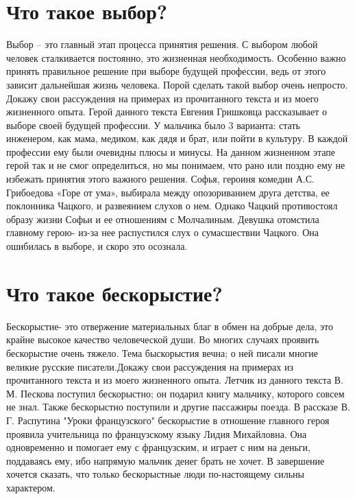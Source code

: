 \documentclass[12pt, letterpaper]{article}
\begin{document}
\section{Что такое выбор?}
Выбор – это главный этап процесса принятия решения. С выбором любой человек сталкивается постоянно, это жизненная необходимость. Особенно важно принять правильное решение при выборе будущей профессии, ведь от этого зависит дальнейшая жизнь человека. Порой сделать такой выбор очень непросто. Докажу свои рассуждения на примерах из прочитанного текста и из моего жизненного опыта.
Герой данного текста Евгения Гришковца рассказывает о выборе своей будущей профессии. У мальчика было 3 варианта: стать инженером, как мама, медиком, как дядя и брат, или пойти в культуру. В каждой профессии ему были очевидны плюсы и минусы. На данном жизненном этапе герой так и не смог определиться, но мы понимаем, что рано или поздно ему не избежать принятия этого важного решения. 
Софья, героиня комедии А.С. Грибоедова «Горе от ума», выбирала между опозориванием друга детства, ее поклонника Чацкого, и развеянием слухов о нем. Однако Чацкий противостоял образу жизни Софьи и ее отношениям с Молчалиным. Девушка отомстила главному герою- из-за нее распустился слух о сумасшествии Чацкого. Она ошибилась в выборе, и скоро это осознала.

\section{Что такое бескорыстие?}
Бескорыстие- это отвержение материальных благ в обмен на добрые дела, это крайне высокое качество человеческой души. Во многих случаях проявить бескорыстие очень тяжело. Тема быскорыстия вечна; о ней писали многие великие русские писатели.Докажу свои рассуждения на примерах из прочитанного текста и из моего жизненного опыта.
Летчик из данного текста В. М. Пескова поступил бескорыстно; он подарил книгу мальчику, которого совсем не знал. Также бескорыстно поступили и другие пассажиры поезда.
В рассказе В. Г. Распутина "Уроки французского" бескорыстие в отношение главного героя проявила учительница по французскому языку Лидия Михайловна. Она одновременно и помогает ему с французским, и играет с ним на деньги, поддаваясь ему, ибо напрямую мальчик денег брать не хочет.
В завершение хочется сказать, что только бескорыстные люди по-настоящему сильны характером.
\end{document}
